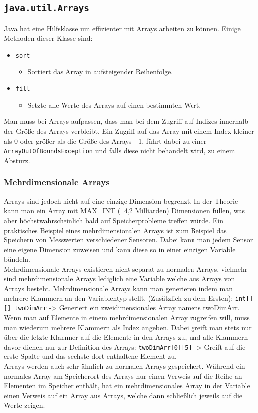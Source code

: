 \documentclass{article}
\begin{document}
	\subsection{\texorpdfstring{\texttt{java.util.Arrays}}{java.util.Arrays}}
	Java hat eine Hilfsklasse um effizienter mit Arrays arbeiten zu können. Einige Methoden dieser Klasse sind:
	\begin{itemize}
		\item{\verb|sort|}
		\begin{itemize}
			\item{Sortiert das Array in aufsteigender Reihenfolge.}
		\end{itemize}
		\item{\verb|fill|}
		\begin{itemize}
			\item{Setzte alle Werte des Arrays auf einen bestimmten Wert.}
		\end{itemize}
	\end{itemize}    
	Man muss bei Arrays aufpassen, dass man bei dem Zugriff auf Indizes innerhalb der Größe des Arrays verbleibt. Ein Zugriff auf das Array mit einem Index kleiner als 0 oder größer als die Größe des Arrays - 1, führt dabei zu einer \verb|ArrayOutOfBoundsException| und falls diese nicht behandelt wird, zu einem Absturz.
	\subsubsection{Mehrdimensionale Arrays}
	Arrays sind jedoch nicht auf eine einzige Dimension begrenzt. In der Theorie kann man ein Array mit MAX\_INT ($~{}$ 4,2 Milliarden) Dimensionen füllen, was aber höchstwahrscheinlich bald auf Speicherprobleme treffen würde. Ein praktisches Beispiel eines mehrdimensionalen Arrays ist zum Beispiel das Speichern von Messwerten verschiedener Sensoren. Dabei kann man jedem Sensor eine eigene Dimension zuweisen und kann diese so in einer einzigen Variable bündeln. \\
	Mehrdimensionale Arrays existieren nicht separat zu normalen Arrays, vielmehr sind mehrdimensionale Arrays lediglich eine Variable welche aus Arrays von Arrays besteht. Mehrdimensionale Arrays kann man generieren indem man mehrere Klammern an den Variablentyp stellt. (Zusätzlich zu dem Ersten): \verb|int[][] twoDimArr| -> Generiert ein zweidimensionales Array namens twoDimArr. Wenn man auf Elemente in einem mehrdimensionalen Array zugreifen will, muss man wiederum mehrere Klammern als Index angeben. Dabei greift man stets nur über die letzte Klammer auf die Elemente in den Arrays zu, und alle Klammern davor dienen nur zur Definition des Arrays: \verb|twoDimArr[0][5]| -> Greift auf die erste Spalte und das sechste dort enthaltene Element zu. \\
	Arrays werden auch sehr ähnlich zu normalen Arrays gespeichert. Während ein normales Array am Speicherort des Arrays nur einen Verweis auf die Reihe an Elementen im Speicher enthält, hat ein mehrdimensionales Array in der Variable einen Verweis auf ein Array aus Arrays, welche dann schließlich jeweils auf die Werte zeigen.  
\end{document}
